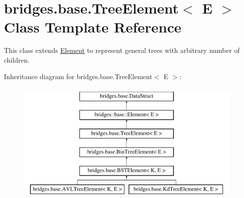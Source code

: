 \hypertarget{classbridges_1_1base_1_1_tree_element}{}\section{bridges.\+base.\+Tree\+Element$<$ E $>$ Class Template Reference}
\label{classbridges_1_1base_1_1_tree_element}


This class extends \hyperlink{classbridges_1_1base_1_1_element}{Element} to represent general trees with arbitrary number of children.  


Inheritance diagram for bridges.\+base.\+Tree\+Element$<$ E $>$\+:\begin{figure}[H]
\begin{center}
\leavevmode
\includegraphics[height=6.000000cm]{classbridges_1_1base_1_1_tree_element}
\end{center}
\end{figure}
